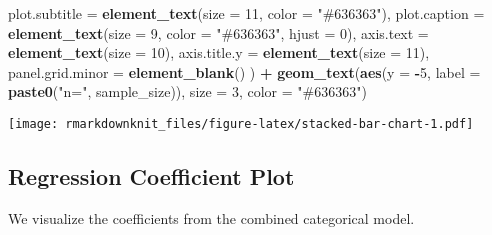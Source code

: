 \documentclass[
]{article}
\newenvironment{Shaded}{\begin{snugshade}}{\end{snugshade}}
\newcommand{\AttributeTok}[1]{\textcolor[rgb]{0.13,0.29,0.53}{#1}}
\newcommand{\DecValTok}[1]{\textcolor[rgb]{0.00,0.00,0.81}{#1}}
\newcommand{\FunctionTok}[1]{\textcolor[rgb]{0.13,0.29,0.53}{\textbf{#1}}}
\newcommand{\NormalTok}[1]{#1}
\newcommand{\SpecialCharTok}[1]{\textcolor[rgb]{0.81,0.36,0.00}{\textbf{#1}}}
\newcommand{\StringTok}[1]{\textcolor[rgb]{0.31,0.60,0.02}{#1}}
\begin{document}
\begin{Shaded}
\begin{Highlighting}[]
    \AttributeTok{plot.subtitle =} \FunctionTok{element\_text}\NormalTok{(}\AttributeTok{size =} \DecValTok{11}\NormalTok{, }\AttributeTok{color =} \StringTok{"\#636363"}\NormalTok{),}
    \AttributeTok{plot.caption =} \FunctionTok{element\_text}\NormalTok{(}\AttributeTok{size =} \DecValTok{9}\NormalTok{, }\AttributeTok{color =} \StringTok{"\#636363"}\NormalTok{, }\AttributeTok{hjust =} \DecValTok{0}\NormalTok{),}
    \AttributeTok{axis.text =} \FunctionTok{element\_text}\NormalTok{(}\AttributeTok{size =} \DecValTok{10}\NormalTok{),}
    \AttributeTok{axis.title.y =} \FunctionTok{element\_text}\NormalTok{(}\AttributeTok{size =} \DecValTok{11}\NormalTok{),}
    \AttributeTok{panel.grid.minor =} \FunctionTok{element\_blank}\NormalTok{()}
\NormalTok{  ) }\SpecialCharTok{+}
  \FunctionTok{geom\_text}\NormalTok{(}\FunctionTok{aes}\NormalTok{(}\AttributeTok{y =} \SpecialCharTok{{-}}\DecValTok{5}\NormalTok{, }\AttributeTok{label =} \FunctionTok{paste0}\NormalTok{(}\StringTok{"n="}\NormalTok{, sample\_size)),}
            \AttributeTok{size =} \DecValTok{3}\NormalTok{, }\AttributeTok{color =} \StringTok{"\#636363"}\NormalTok{)}
\end{Highlighting}
\end{Shaded}

\texttt{[image: rmarkdownknit\_files/figure-latex/stacked-bar-chart-1.pdf]}

\subsection{Regression Coefficient
Plot}\label{regression-coefficient-plot}

We visualize the coefficients from the combined categorical model.
\end{document}

